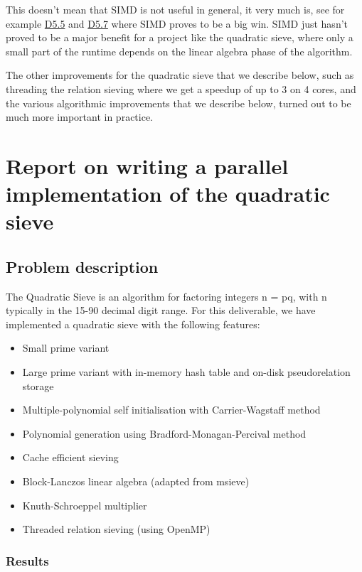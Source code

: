 This doesn't mean that SIMD is not useful in general, it very much is,
see for example
\href{https://github.com/OpenDreamKit/OpenDreamKit/issues/118}{D5.5} and
\href{https://github.com/OpenDreamKit/OpenDreamKit/issues/120}{D5.7}
where SIMD proves to be a big win. SIMD just hasn't proved to be a major
benefit for a project like the quadratic sieve, where only a small part
of the runtime depends on the linear algebra phase of the algorithm.

The other improvements for the quadratic sieve that we describe below,
such as threading the relation sieving where we get a speedup of up to 3
on 4 cores, and the various algorithmic improvements that we describe
below, turned out to be much more important in practice.

\section*{Report on writing a parallel implementation of the quadratic
sieve}\label{report-on-writing-a-parallel-implementation-of-the-quadratic-sieve}

\subsection{Problem description}\label{problem-description}

The Quadratic Sieve is an algorithm for factoring integers n = pq, with
n typically in the 15-90 decimal digit range. For this deliverable, we
have implemented a quadratic sieve with the following features:

\begin{itemize}
\tightlist
\item
  Small prime variant
\item
  Large prime variant with in-memory hash table and on-disk
  pseudorelation storage
\item
  Multiple-polynomial self initialisation with Carrier-Wagstaff method
\item
  Polynomial generation using Bradford-Monagan-Percival method
\item
  Cache efficient sieving
\item
  Block-Lanczos linear algebra (adapted from msieve)
\item
  Knuth-Schroeppel multiplier
\item
  Threaded relation sieving (using OpenMP)
\end{itemize}

\subsubsection{Results}\label{results}

